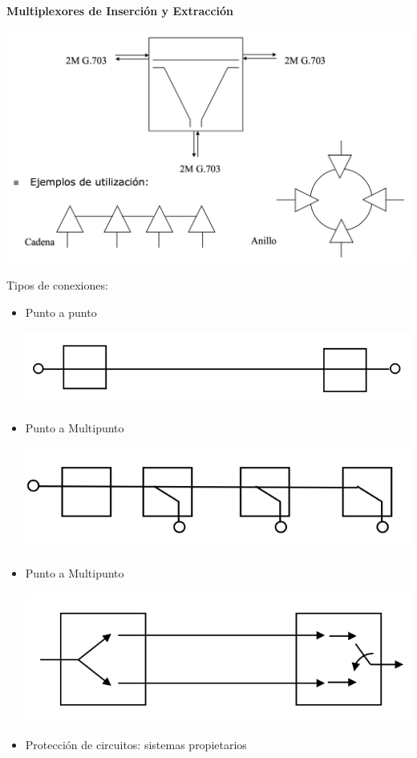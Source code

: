 \documentclass[10pt,portrait, twocolumn]{article}
\begin{document}
\textbf{Multiplexores de Inserción y Extracción}

	\begin{center}
		\includegraphics[scale=0.2]{images/MuxExtra}
	\end{center}

Tipos de conexiones:

	\begin{itemize}
	\item Punto a punto
		\begin{center}
			\includegraphics[scale=0.2]{images/P2P}
		\end{center}
	\item Punto a Multipunto
		\begin{center}
			\includegraphics[scale=0.2]{images/P2M}
		\end{center}
	\item Punto a Multipunto
		\begin{center}
			\includegraphics[scale=0.2]{images/Uni}
		\end{center}
	\item Protección de circuitos: sistemas propietarios
	\end{itemize}
\end{document}
